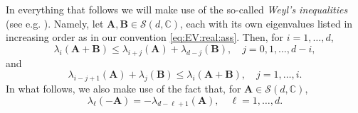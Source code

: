 \documentclass[9pt,twocolumn,twoside]{pnas-new}
\newcommand{\bbC}{{\mathbb C}}
\newcommand{\?}{\textbf{?}}
\begin{document}
In everything that follows we will make use of the so-called
\textit{Weyl's inequalities} (see e.g.
\cite[Theorem 4.3.1, p.\ 239]{horn:johnson:2012}). Namely, let
${\mathbf A},{\mathbf B} \in {\mathcal S}(d,\bbC)$, each with its own
eigenvalues listed in increasing order as in our convention
\eqref{eq:EV:real:ass}. Then, for $i = 1,\hdots,d$,
\begin{equation}\label{e:Weyl_upper}
  \lambda_i({\mathbf A}+{\mathbf B}) \leq
  \lambda_{i+j}({\mathbf A}) + \lambda_{d-j}({\mathbf B}),
  \quad j = 0,1,\hdots,d-i,
\end{equation}
and
\begin{equation}\label{e:Weyl_lower}
  \lambda_{i-j+1}({\mathbf A}) + \lambda_j({\mathbf B})
  \leq \lambda_i({\mathbf A}+{\mathbf B}), \quad j = 1,\hdots,i.
\end{equation}
In what follows, we also make use of the fact that, for ${\mathbf A} \in {\mathcal S}(d,\bbC)$,
\begin{equation}\label{e:eigenvals_of_-A}
  \lambda_\ell(-{\mathbf A}) = - \lambda_{d-\ell+1}({\mathbf A}),
  \quad \ell = 1,\hdots,d.
\end{equation}
\end{document}
